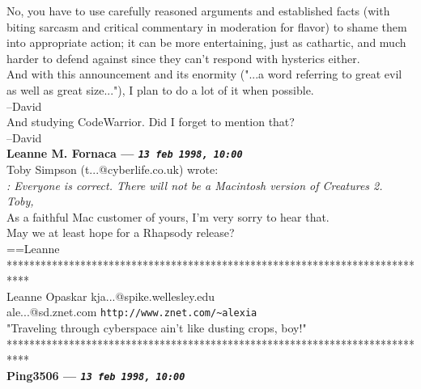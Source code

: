 \documentclass[11pt,twoside,a4paper]{article}
\begin{document}
\begin{multicols*}{2}
No, you have to use carefully reasoned arguments and established facts (with biting sarcasm and critical commentary in moderation for flavor) to shame them into appropriate action; it can be more entertaining, just as cathartic, and much harder to defend against since they can't respond with hysterics either.~\\

And with this announcement and its enormity ("...a word referring to great evil as well as great size..."), I plan to do a lot of it when possible.~\\

--David~\\
And studying CodeWarrior. Did I forget to mention that?~\\
--David~\\

 
		
	
		
\textbf{Leanne M. Fornaca --- \emph{\texttt{13 feb 1998, 10:00}}}~\\

Toby Simpson (t...@cyberlife.co.uk) wrote:~\\
\emph{: Everyone is correct. There will not be a Macintosh version of Creatures 2.}~\\
\emph{Toby,}~\\

As a faithful Mac customer of yours, I'm very sorry to hear that.~\\
May we at least hope for a Rhapsody release?~\\

                ==Leanne~\\

****************************************************************************~\\
Leanne Opaskar                                   kja...@spike.wellesley.edu~\\
ale...@sd.znet.com                               \texttt{http://www.znet.com/\textasciitilde alexia}~\\
"Traveling through cyberspace ain't like dusting crops, boy!"~\\
****************************************************************************~\\

 
		
	
		
\textbf{Ping3506 --- \emph{\texttt{13 feb 1998, 10:00}}}~\\


\end{multicols*}
\end{document}
